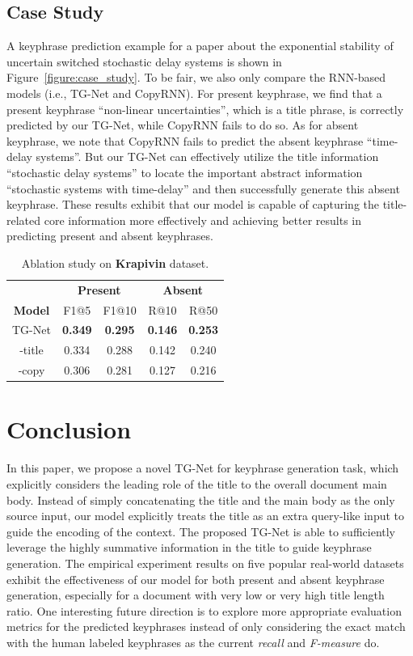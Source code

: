 \documentclass[letterpaper]{article} %
\begin{document}
\subsection{Case Study}
A keyphrase prediction example for a paper about the exponential stability of uncertain switched stochastic delay systems is shown in Figure~\ref{figure:case_study}. To be fair, we also only compare the RNN-based models (i.e., TG-Net and CopyRNN). For present keyphrase, we find that a present keyphrase ``non-linear uncertainties'', which is a title phrase, is correctly predicted by our TG-Net, while CopyRNN fails to do so. As for absent keyphrase, we note that CopyRNN fails to predict the absent keyphrase ``time-delay systems''. But our TG-Net can effectively utilize the title information ``stochastic delay systems'' to locate the important abstract information ``stochastic systems with time-delay'' and then successfully generate this absent keyphrase. These results exhibit that our model is capable of capturing the title-related core information more effectively and achieving better results in predicting present and absent keyphrases.


\begin{table}[t]
\centering
\begin{tabular}{c| c c| c c}
  \hline
  \hline
  & \multicolumn{2}{c|}{\textbf{Present}} & \multicolumn{2}{c}{\textbf{Absent}}
  \\
  \textbf{Model} & F1@5 & F1@10 & R@10 & R@50
  \\
  \hline
  \hline
  TG-Net & \textbf{0.349} & \textbf{0.295} & \textbf{0.146} & \textbf{0.253}\\
  \hline
 -title & 0.334 & 0.288 & 0.142 & 0.240\\
  \hline
 -copy & 0.306 & 0.281 & 0.127 & 0.216\\
  \hline
\end{tabular}
\caption{Ablation study on \textbf{Krapivin} dataset.}
\label{table:ablation study}
\end{table}

\section{Conclusion} \label{section: conclusion}
In this paper, we propose a novel TG-Net for keyphrase generation task, which explicitly considers the leading role of the title to the overall document main body. Instead of simply concatenating the title and the main body as the only source input, our model explicitly treats the title as an extra query-like input to guide the encoding of the context. The proposed TG-Net is able to sufficiently leverage the highly summative information in the title to guide keyphrase generation. The empirical experiment results on five popular real-world datasets exhibit the effectiveness of our model for both present and absent keyphrase generation, especially for a document with very low or very high title length ratio. One interesting future direction is to explore more appropriate evaluation metrics for the predicted keyphrases instead of only considering the exact match with the human labeled keyphrases as the current \textit{recall} and \textit{F-measure} do.
\end{document}
